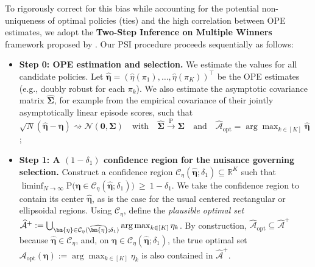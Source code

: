 \documentclass[12pt]{article}
\theoremstyle{remark}\newtheorem{remark}[theorem]{Remark}\theoremstyle{plain}
\newcommand{\pr}{\mathrm{P}}
\begin{document}
To rigorously correct for this bias while accounting for the potential non-uniqueness of optimal policies (ties) and the high correlation between OPE estimates, we adopt the \textbf{Two-Step Inference on Multiple Winners} framework proposed by \cite{petrou2024inference}.
Our PSI procedure proceeds sequentially as follows:
\begin{itemize}
    \item \textbf{Step 0: OPE estimation and selection.} We estimate the values for all candidate policies.
    Let $\widehat{\bm{\eta}}=(\widehat{\eta}(\pi_1),\dots,\widehat{\eta}(\pi_K))^\top$ be the OPE estimates (e.g., doubly robust for each $\pi_k$). We also estimate the asymptotic covariance matrix $\widehat{\boldsymbol{\Sigma}}$, for example from the empirical covariance of their jointly asymptotically linear episode scores, such that
    $
        \sqrt{N}(\widehat{\bm{\eta}} - \bm{\eta}) \rightsquigarrow \mathcal{N}(\bm{0}, \boldsymbol{\Sigma}) \quad \text{with} \quad \widehat{\boldsymbol{\Sigma}} \overset{\pr}{\to} \boldsymbol{\Sigma} \quad \text{and} \quad \widehat{\mathcal{A}}_{\text{opt}} = \arg\max_{k \in [K]} \widehat{\bm{\eta}}$;

    \item \textbf{Step 1: A $(1-\delta_1)$ confidence region for the nuisance governing selection.} Construct a confidence region $\mathcal{C}_\eta(\widehat{\bm{\eta}};\delta_1)\subseteq \mathbb{R}^K$ such that
        $\liminf_{N\to\infty} \pr\Big(\bm{\eta}\in \mathcal{C}_\eta(\widehat{\bm{\eta}};\delta_1)\Big)\ \ge\ 1-\delta_1$.
    We take the confidence region to contain its center
    $\widehat{\bm\eta}$, as is the case for the usual centered
    rectangular or ellipsoidal regions.  Using
    $\mathcal{C}_\eta$, define the \emph{plausible optimal set}
        $\widehat{\mathcal{A}}^{+} := \bigcup_{\bm{\eta} \in \mathcal{C}_\eta(\widehat{\bm{\eta}};\delta_1)} \arg\max_{k\in[K]} \penalty 0 \eta_k$.
    By construction,
    $\widehat{\mathcal A}_{\mathrm{opt}}\subseteq
    \widehat{\mathcal A}^{+}$ because
    $\widehat{\bm\eta}\in\mathcal C_\eta$, and, on
    ${\bm{\eta}\in
    \mathcal{C}_\eta(\widehat{\bm{\eta}};\delta_1)}$, the true
    optimal set
    $\mathcal A_{\mathrm{opt}}(\bm\eta):=
      \arg\max_{k\in[K]}\eta_k$
    is also contained in $\widehat{\mathcal A}^{+}$.



\end{itemize}
\end{document}
